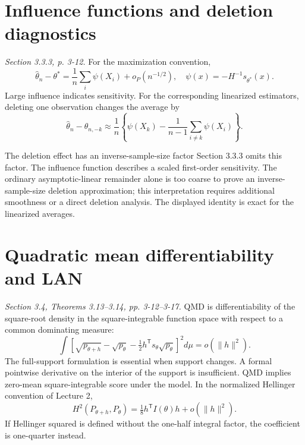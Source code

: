 \documentclass[12pt]{article}
\begin{document}
\section{Influence functions and deletion diagnostics}
\textit{Section 3.3.3, p. 3-12.}
For the maximization convention,
\begin{equation}
 \widehat\theta_n-\theta^*=\frac1n\sum_i\psi(X_i)+o_P(n^{-1/2}),
 \quad\psi(x)=-H^{-1}s_{\theta^*}(x).
\end{equation}
Large influence indicates sensitivity. For the corresponding linearized
estimators, deleting one observation changes the average by
\begin{equation}
 \widehat\theta_n-\widehat\theta_{n,-k}
 \approx\frac1n\left\{\psi(X_k)-\frac1{n-1}\sum_{i\ne k}\psi(X_i)\right\}.
\end{equation}
\begin{correctionbox}{The deletion effect has an inverse-sample-size factor}
Section 3.3.3 omits this factor. The influence function describes a scaled
first-order sensitivity. The ordinary asymptotic-linear remainder alone
is too coarse to prove an inverse-sample-size deletion approximation;
this interpretation requires additional smoothness or a direct deletion
analysis. The displayed identity is exact for the linearized averages.
\end{correctionbox}

\section{Quadratic mean differentiability and LAN}
\textit{Section 3.4, Theorems 3.13--3.14, pp. 3-12--3-17.}
QMD is differentiability of the square-root density in the square-integrable
function space with respect to a common dominating measure:
\begin{equation}
 \int\left[\sqrt{p_{\theta+h}}-\sqrt{p_\theta}
 -\tfrac12h^{\mathsf T}s_\theta\sqrt{p_\theta}\right]^2d\mu
 =o(\|h\|^2).
\end{equation}
The full-support formulation is essential when support changes. A formal
pointwise derivative on the interior of the support is insufficient.
QMD implies zero-mean square-integrable score under the model. In the
normalized Hellinger convention of Lecture 2,
\begin{equation}
 H^2(P_{\theta+h},P_\theta)=\tfrac18h^{\mathsf T}I(\theta)h
 +o(\|h\|^2).
\end{equation}
If Hellinger squared is defined without the one-half integral factor,
the coefficient is one-quarter instead.
\end{document}
